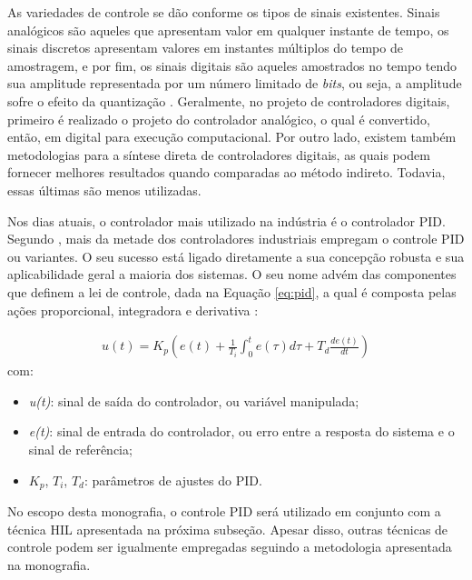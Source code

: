 As variedades de controle se dão conforme os tipos de sinais existentes. Sinais 
analógicos são aqueles que apresentam valor em qualquer instante de tempo, os 
sinais discretos apresentam valores em instantes múltiplos do tempo de amostragem, e 
por fim, os sinais digitais são aqueles amostrados no tempo tendo sua 
amplitude representada por um número limitado de \textit{bits}, ou seja, a amplitude 
sofre o efeito da quantização \cite{Castrucci}. Geralmente, no projeto de controladores
digitais, primeiro é realizado o projeto do controlador analógico, o qual é convertido, 
então, em digital para execução computacional. Por outro lado, existem também 
metodologias para a síntese direta de controladores digitais, as quais podem fornecer 
melhores resultados quando comparadas ao método indireto. Todavia, essas últimas são menos utilizadas.

Nos dias atuais, o controlador mais utilizado na indústria é o controlador PID. 
Segundo , mais da metade dos controladores industriais empregam
o controle PID ou variantes. O seu sucesso está ligado diretamente a sua 
concepção robusta e sua aplicabilidade geral a maioria dos sistemas. O seu nome 
advém das componentes que definem a lei de controle, dada na Equação \eqref{eq:pid}, a qual é composta
pelas ações proporcional, integradora e derivativa \cite{Castrucci}:

\begin{equation}
  \begin{gathered}
    u(t) = K_p\left(e(t)+\frac{1}{T_i}\int_{0}^{t}e(\tau)d\tau+T_d\frac{de(t)}{dt}\right)
  \end{gathered}
  \label{eq:pid}
\end{equation}
com:

\begin{itemize}
 \item \textit{u(t)}: sinal de saída do controlador, ou variável manipulada;
 \item \textit{e(t)}: sinal de entrada do controlador, ou erro entre a resposta do sistema e o sinal de referência;
 \item $K_p$, $T_i$, $T_d$: parâmetros de ajustes do PID.
\end{itemize}

No escopo desta monografia, o controle PID será utilizado em conjunto com a técnica HIL apresentada 
na próxima subseção. Apesar disso, outras técnicas de controle podem ser igualmente empregadas seguindo 
a metodologia apresentada na monografia.

